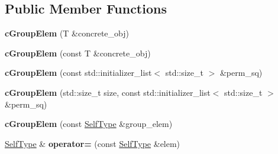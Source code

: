 \subsection*{\-Public \-Member \-Functions}
\begin{DoxyCompactItemize}
\item 
\hypertarget{classcGroupElem_ac677380fd35b7307be8230e01c47d24a}{{\bfseries c\-Group\-Elem} (\-T \&concrete\-\_\-obj)}\label{classcGroupElem_ac677380fd35b7307be8230e01c47d24a}

\item 
\hypertarget{classcGroupElem_a7e61b42847fb382a00025af19baf2132}{{\bfseries c\-Group\-Elem} (const \-T \&concrete\-\_\-obj)}\label{classcGroupElem_a7e61b42847fb382a00025af19baf2132}

\item 
\hypertarget{classcGroupElem_a13a796803737218c08e3d6bb652732d1}{{\bfseries c\-Group\-Elem} (const std\-::initializer\-\_\-list$<$ std\-::size\-\_\-t $>$ \&perm\-\_\-sq)}\label{classcGroupElem_a13a796803737218c08e3d6bb652732d1}

\item 
\hypertarget{classcGroupElem_aaa558bbe798129dccc53712777e1bd4e}{{\bfseries c\-Group\-Elem} (std\-::size\-\_\-t size, const std\-::initializer\-\_\-list$<$ std\-::size\-\_\-t $>$ \&perm\-\_\-sq)}\label{classcGroupElem_aaa558bbe798129dccc53712777e1bd4e}

\item 
\hypertarget{classcGroupElem_af2fe12bf9a1291a5c30905449e2b3a2b}{{\bfseries c\-Group\-Elem} (const \hyperlink{classcGroupElem}{\-Self\-Type} \&group\-\_\-elem)}\label{classcGroupElem_af2fe12bf9a1291a5c30905449e2b3a2b}

\item 
\hypertarget{classcGroupElem_a75d7cd6508130c2632042fa42041b874}{\hyperlink{classcGroupElem}{\-Self\-Type} \& {\bfseries operator=} (const \hyperlink{classcGroupElem}{\-Self\-Type} \&elem)}\label{classcGroupElem_a75d7cd6508130c2632042fa42041b874}


\end{DoxyCompactItemize}
